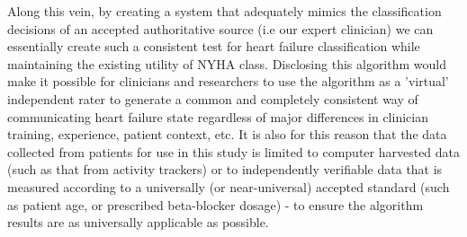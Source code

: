 \documentclass[]{article}
\begin{document}
Along this vein, by creating a system that adequately mimics the classification decisions of an accepted authoritative source (i.e our expert clinician) we can essentially create such a consistent test for heart failure classification while maintaining the existing utility of NYHA class. Disclosing this algorithm would make it possible for clinicians and researchers to use the algorithm as a 'virtual' independent rater to generate a common and completely consistent way of communicating heart failure state regardless of major differences in clinician training, experience, patient context, etc. It is also for this reason that the data collected from patients for use in this study is limited to computer harvested data (such as that from activity trackers) or to independently verifiable data that is measured according to a universally (or near-universal) accepted standard (such as patient age, or prescribed beta-blocker dosage) - to ensure the algorithm results are as universally applicable as possible.
\end{document}
